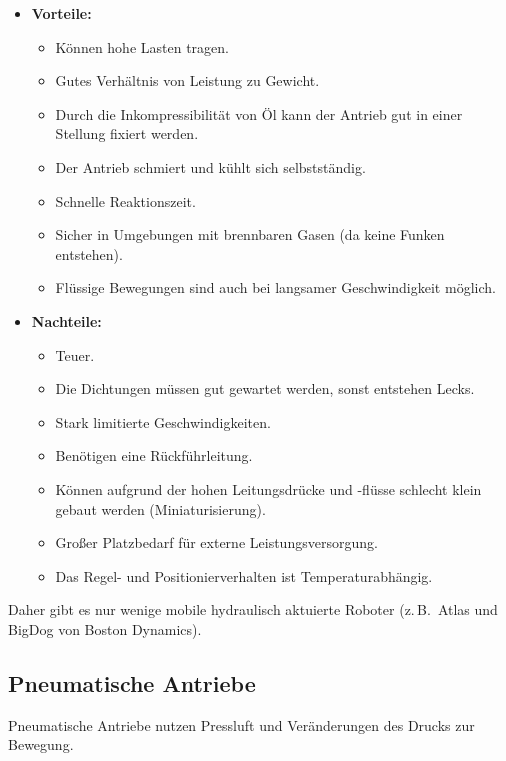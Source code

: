 \documentclass[a4paper, 11pt, accentcolor = tud3b]{tudreport}
\newcommand{\zB}{z.\,B.~}
\begin{document}
				\begin{itemize}
					\item \textbf{Vorteile:}
						\begin{itemize}
							\item Können hohe Lasten tragen.
							\item Gutes Verhältnis von Leistung zu Gewicht.
							\item Durch die Inkompressibilität von Öl kann der Antrieb gut in einer Stellung fixiert werden.
							\item Der Antrieb schmiert und kühlt sich selbstständig.
							\item Schnelle Reaktionszeit.
							\item Sicher in Umgebungen mit brennbaren Gasen (da keine Funken entstehen).
							\item Flüssige Bewegungen sind auch bei langsamer Geschwindigkeit möglich.
						\end{itemize}
					\item \textbf{Nachteile:}
						\begin{itemize}
							\item Teuer.
							\item Die Dichtungen müssen gut gewartet werden, sonst entstehen Lecks.
							\item Stark limitierte Geschwindigkeiten.
							\item Benötigen eine Rückführleitung.
							\item Können aufgrund der hohen Leitungsdrücke und -flüsse schlecht klein gebaut werden (Miniaturisierung).
							\item Großer Platzbedarf für externe Leistungsversorgung.
							\item Das Regel- und Positionierverhalten ist Temperaturabhängig.
						\end{itemize}
				\end{itemize}
			
				Daher gibt es nur wenige mobile hydraulisch aktuierte Roboter (\zB Atlas und BigDog von Boston Dynamics).

			\subsection{Pneumatische Antriebe}
				Pneumatische Antriebe nutzen Pressluft und Veränderungen des Drucks zur Bewegung.
				
\end{document}
